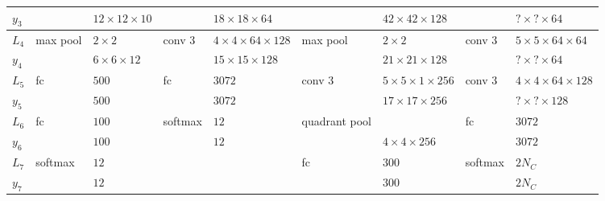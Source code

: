\documentclass[9pt]{article} \usepackage{amsmath, amsthm, amssymb}
\begin{document}
\begin{table}[h!]
{\begin{tabular}{|lllllllll|}
\multicolumn{1}{|l|}{$y_3$}   &          & \multicolumn{1}{l|}{$12\times 12 \times 10$}       &          & \multicolumn{1}{l|}{$18 \times 18\times64$}          &               & \multicolumn{1}{l|}{$42\times42\times128$}       &           & $?\times?\times64$             \\ \hline
\multicolumn{1}{|l|}{$L_4$}   & max pool & \multicolumn{1}{l|}{$2\times 2$}                   & conv 3   & \multicolumn{1}{l|}{$4\times 4 \times64 \times 128$} & max pool      & \multicolumn{1}{l|}{$2\times2$}                  & conv 3    & $5\times5\times64\times64$     \\
\multicolumn{1}{|l|}{$y_4$}   &          & \multicolumn{1}{l|}{$6\times 6 \times 12$}         &          & \multicolumn{1}{l|}{$15\times15\times128$}           &               & \multicolumn{1}{l|}{$21\times21\times128$}       &           & $?\times?\times64$             \\ \hline
\multicolumn{1}{|l|}{$L_5$}   & fc       & \multicolumn{1}{l|}{$500$}                         & fc       & \multicolumn{1}{l|}{$3072$}                          & conv 3        & \multicolumn{1}{l|}{$5\times5\times1\times256$}  & conv 3    & $4\times4\times64\times128$    \\
\multicolumn{1}{|l|}{$y_5$}   &          & \multicolumn{1}{l|}{$500$}                         &          & \multicolumn{1}{l|}{$3072$}                          &               & \multicolumn{1}{l|}{$17\times17\times256$}       &           & $?\times?\times128$            \\ \hline
\multicolumn{1}{|l|}{$L_6$}   & fc       & \multicolumn{1}{l|}{$100$}                         & softmax  & \multicolumn{1}{l|}{$12$}                            & quadrant pool & \multicolumn{1}{l|}{}                            & fc        & $3072$                         \\
\multicolumn{1}{|l|}{$y_6$}   &          & \multicolumn{1}{l|}{$100$}                         &          & \multicolumn{1}{l|}{$12$}                            &               & \multicolumn{1}{l|}{$4\times4\times256$}         &           & $3072$                         \\ \hline
\multicolumn{1}{|l|}{$L_7$}   & softmax  & \multicolumn{1}{l|}{$12$}                          &          & \multicolumn{1}{l|}{}                                & fc            & \multicolumn{1}{l|}{$300$}                       & softmax   & $2N_{C}$                       \\
\multicolumn{1}{|l|}{$y_7$}   &          & \multicolumn{1}{l|}{$12$}                          &          & \multicolumn{1}{l|}{}                                &               & \multicolumn{1}{l|}{$300$}                       &           & $2N_{C}$                       \\ \hline

\end{tabular}}
\end{table}
\end{document}
